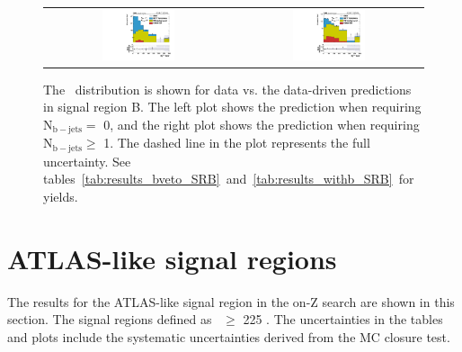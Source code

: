 \begin{figure}[!ht]
\begin{center}
\begin{tabular}{cc}
\includegraphics[width=0.4\textwidth]{results/figs/SRB_bveto_MET_yield_hist.pdf} &
\includegraphics[width=0.4\textwidth]{results/figs/SRB_withb_MET_yield_hist.pdf} \\
\end{tabular}
\caption{
  \label{fig:results_SRB}
  The \MET\ distribution is shown for data vs. the data-driven predictions in signal region B.
  The left plot shows the prediction when requiring N$\mathrm{_{b-jets}} =$ 0, and the right plot shows the prediction when requiring N$\mathrm{_{b-jets}} \geq$ 1.
  The dashed line in the plot represents the full uncertainty.
  See tables~\ref{tab:results_bveto_SRB}~and~\ref{tab:results_withb_SRB}~for yields.
}
\end{center}
\end{figure}

\clearpage


\section{ATLAS-like signal regions}

The results for the ATLAS-like signal region in the on-Z search are shown in this section.
The signal regions defined as \MET\ $\geq$ 225 \gev.
The uncertainties in the tables and plots include the systematic uncertainties derived from the MC closure test.

